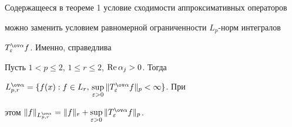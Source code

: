 Содержащееся в теореме 1 условие сходимости аппроксимативных операторов


можно заменить условием равномерной ограниченности $L_p$-норм интегралов


$T^{\ov\alpha}_\varepsilon f$. Именно, справедлива





\begin{thm}


Пусть $1<p\le 2$, $1\le r\le 2$, $\operatorname{Re}\alpha_j>0$. Тогда


$\spaceL=\{f(x):f\in L_r,\,\sup\limits_{\varepsilon>0}


\|T^{\ov\alpha}_\varepsilon f\|_p<\infty\}$. При


этом $\|f\|_{\spaceL}=\|f\|_r+\sup\limits_{\varepsilon>0}


\|T^{\ov\alpha}_\varepsilon f\|_p$.


\end{thm}





